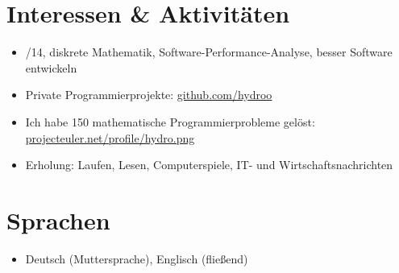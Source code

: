 \vspace{0.66cm} %

\customhrule
\section*{Interessen \& Aktivit\"aten}
\begin{itemize}
	\item {}/14, diskrete Mathematik, Software-Performance-Analyse, besser Software entwickeln
	\item Private Programmierprojekte: \href{https://github.com/hydroo}{github.com/hydroo}
	\item Ich habe 150 mathematische Programmierprobleme gel\"ost: \href{http://projecteuler.net/profile/hydro.png}{projecteuler.net/profile/hydro.png}
	\item Erholung: Laufen, Lesen, Computerspiele, IT- und Wirtschaftsnachrichten
\end{itemize}

\customhrule
\section*{Sprachen}
\begin{itemize}
	\item Deutsch (Muttersprache), Englisch (flie\ss end)
\end{itemize}


